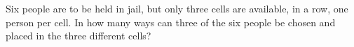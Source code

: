 Six people are to be held in jail, but only three cells are available, in a row, one person per cell. In how many ways can three of the six people be chosen and placed in the three different cells?
